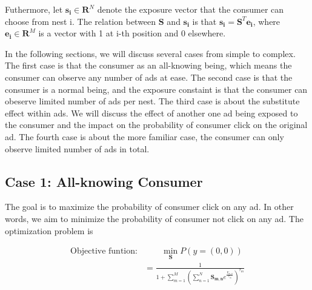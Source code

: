 \documentclass[12pt]{article}
\theoremstyle{definition}
\newcommand{\matr}[1]{\mathbf{#1}} %
\begin{document}
\begin{sloppypar}
Futhermore, let $\matr{s_i} \in \mathbf{R}^{N}$ denote the exposure vector that the consumer can choose from nest i. The relation between $\matr{S}$ and $\matr{s_i}$ is that $\matr{s_i} = \matr{S}^T \matr{e_i}$, where $\matr{e_i} \in \mathbf{R}^{M}$ is a vector with 1 at i-th position and 0 elsewhere.

\indent In the following sections, we will discuss several cases from simple to complex. The first case is that the consumer as an all-knowing being, which means the consumer can observe any number of ads at ease. The second case is that the consumer is a normal being, and the exposure constaint is that the consumer can obeserve limited number of ads per nest. The third case is about the substitute effect within ads. We will discuss the effect of another one ad being exposed to the consumer and the impact on the probability of consumer click on the original ad. The fourth case is about the more familiar case, the consumer can only observe limited number of ads in total. 

\subsection{Case 1: All-knowing Consumer}
\indent The goal is to maximize the probability of consumer click on any ad. In other words, we aim to minimize the probability of consumer not click on any ad. The optimization problem is

\begin{align}
    \text{Objective funtion:} &\qquad \min_{\matr{S}} P(y=(0,0)) \nonumber \\
    &= \frac{1}{1+\sum_{m=1}^{M}(\sum_{n=1}^{N} \matr{S_{m,n}}e^\frac{{V_{m,n}}}{\tau_m})^{\tau_m}}
\end{align}


\end{sloppypar}
\end{document}
